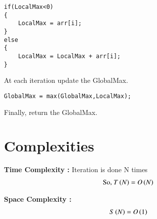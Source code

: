 \documentclass[journal,12pt,twocolumn]{IEEEtran}
\begin{document}
\begin{lstlisting}
if(LocalMax<0)
{
    LocalMax = arr[i];
}
else
{
    LocalMax = LocalMax + arr[i];
}
\end{lstlisting}

At each iteration update the GlobalMax.\\
\begin{lstlisting}
GlobalMax = max(GlobalMax,LocalMax);
\end{lstlisting}

Finally, return the GlobalMax.

\section{Complexities}

\textbf{Time Complexity :} Iteration is done N times 
\begin{align}
    \text{So, }T\left(N\right) = O\left(N\right)
\end{align}

\textbf{Space Complexity :}
\begin{align}
    S\left(N\right) = O\left(1\right)
\end{align}
\end{document}
